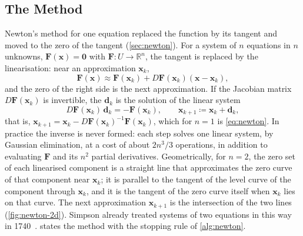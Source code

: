 \subsection{The Method}

Newton's method for one equation replaced the function by its tangent and moved to the zero of the tangent (\cref{sec:newton}). For a system of $n$ equations in $n$ unknowns, $\mathbf F(\mathbf x)=\mathbf0$ with $\mathbf F\colon U\to\mathbb R^n$, the tangent is replaced by the linearisation: near an approximation $\mathbf x_k$,
\[
\mathbf F(\mathbf x)\approx\mathbf F(\mathbf x_k)+D\mathbf F(\mathbf x_k)(\mathbf x-\mathbf x_k),
\]
and the zero of the right side is the next approximation. If the Jacobian matrix $D\mathbf F(\mathbf x_k)$ is invertible, the  $\mathbf d_k$ is the solution of the linear system
\begin{equation}
D\mathbf F(\mathbf x_k)\,\mathbf d_k=-\mathbf F(\mathbf x_k),\qquad\mathbf x_{k+1}\coloneqq\mathbf x_k+\mathbf d_k ,
\label{eq:newton-n}
\end{equation}
that is, $\mathbf x_{k+1}=\mathbf x_k-D\mathbf F(\mathbf x_k)^{-1}\mathbf F(\mathbf x_k)$, which for $n=1$ is \eqref{eq:newton}. In practice the inverse is never formed: each step solves one linear system, by Gaussian elimination, at a cost of about $2n^3/3$ operations, in addition to evaluating $\mathbf F$ and its $n^2$ partial derivatives. Geometrically, for $n=2$, the zero set of each linearised component is a straight line that approximates the zero curve of that component near $\mathbf x_k$; it is parallel to the tangent of the level curve of the component through $\mathbf x_k$, and it is the tangent of the zero curve itself when $\mathbf x_k$ lies on that curve. The next approximation $\mathbf x_{k+1}$ is the intersection of the two lines (\cref{fig:newton-2d}). Simpson already treated systems of two equations in this way in 1740~\cite{ypma1995}.  states the method with the stopping rule of \cref{alg:newton}.

